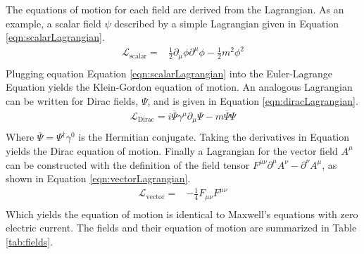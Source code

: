 The equations of motion for each field are derived from the Lagrangian.
As an example, a scalar field $\psi$ described by a simple Lagrangian given in Equation \ref{eqn:scalarLagrangian}.
\begin{equation}\begin{split}\label{eqn:scalarLagrangian}
    \mathcal{L}_\text{scalar}=&\frac{1}{2}\partial_\mu\phi\partial^\mu\phi-\frac{1}{2}m^2\phi^2 \\
\end{split}\end{equation}
Plugging equation Equation \ref{eqn:scalarLagrangian} into the Euler-Lagrange Equation \label{eqn:el} yields the Klein-Gordon equation of motion.
An analogous Lagrangian can be written for Dirac fields, $\Psi$, and is given in Equation \ref{eqn:diracLagrangian}.
\begin{equation}\begin{split}\label{eqn:diracLagrangian}
    \mathcal{L}_\text{Dirac}=i\overline{\Psi}\gamma^\mu\partial_\mu\Psi-m\overline{\Psi}\Psi \\
\end{split}\end{equation} 
Where $\overline{\Psi}=\Psi^\dagger\gamma^0$ is the Hermitian conjugate.
Taking the derivatives in Equation \label{eqn:el} yields the Dirac equation of motion.
Finally a Lagrangian for the vector field $A^\mu$ can be constructed with the definition of the field tensor $F^{\mu\nu}\partial^\mu A^\nu-\partial^\nu A^\mu$, as shown in Equation \ref{eqn:vectorLagrangian}.
\begin{equation}\begin{split}\label{eqn:vectorLagrangian}
    \mathcal{L}_\text{vector}=&-\frac{1}{4}F_{\mu\nu}F^{\mu\nu} \\
\end{split}\end{equation} 
Which yields the equation of motion is identical to Maxwell's equations with zero electric current.
The fields and their equation of motion are summarized in Table \ref{tab:fields}.

